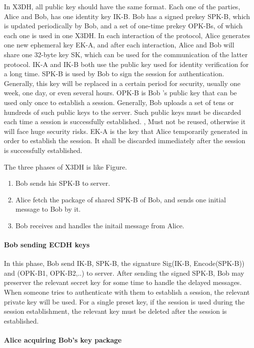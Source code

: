 \documentclass[11pt,en]{elegantpaper}
\begin{document}
In X3DH, all public key should have the same format. Each one of the parties, Alice and Bob, has one identity key IK-B. Bob has a signed prekey SPK-B, which is updated periodically by Bob, and a set of one-time prekey OPK-Bs, of which each one is used in one X3DH. In each interaction of the protocol, Alice generates one new ephemeral key EK-A, and after each interaction, Alice and Bob will share one 32-byte key SK, which can be used for the communication of the latter protocol. IK-A and IK-B both use the public key used for identity verification for a long time. SPK-B is used by Bob to sign the session for authentication. Generally, this key will be replaced in a certain period for security, usually one week, one day, or even several hours. OPK-B is Bob ’s public key that can be used only once to establish a session. Generally, Bob uploads a set of tens or hundreds of such public keys to the server. Such public keys must be discarded each time a session is successfully established. , Must not be reused, otherwise it will face huge security risks. EK-A is the key that Alice temporarily generated in order to establish the session. It shall be discarded immediately after the session is successfully established.

The three phases of X3DH is like Figure.

\begin{enumerate}
    \item Bob sends his SPK-B to server.
    \item Alice fetch the package of shared SPK-B of Bob, and sends one initial message to Bob by it.
    \item Bob receives and handles the initail message from Alice.
\end{enumerate}

\paragraph{Bob sending ECDH keys}
In this phase, Bob send IK-B, SPK-B, the signature Sig(IK-B, Encode(SPK-B)) and (OPK-B1, OPK-B2,..) to server. After sending the signed SPK-B, Bob may preserver the relevant secret key for some time to handle the delayed messages. When someone tries to authenticate with them to establish a session, the relevant private key will be used. For a single preset key, if the session is used during the session establishment, the relevant key must be deleted after the session is established.

\paragraph{Alice acquiring Bob's key package}
\end{document}
